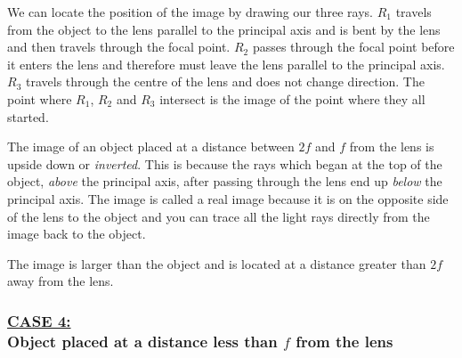 We can locate the position of the image by drawing our three rays. $R_{1}$ travels from the object to the lens parallel to the principal axis and is bent by the lens and then travels through the focal point. $R_{2}$ passes through the focal point before it enters the lens and therefore must leave the lens parallel to the principal axis. $R_{3}$ travels through the centre of the lens and does not change direction. The point where $R_{1}$, $R_{2}$ and $R_{3}$ intersect is the image of the point where they all started.

The image of an object placed at a distance between $2f$ and $f$ from the lens is upside down or \textit{inverted}. This is because the rays which began at the top of the object, \textit{above} the principal axis, after passing through the lens end up \textit{below} the principal axis. The image is called a real image because it is on the opposite side of the lens to the object and you can trace all the light rays directly from the image back to the object.

The image is larger than the object and is located at a distance greater than $2f$ away from the lens.

\subsubsection{\underline{CASE 4:}\\Object placed at a distance less than $f$ from the lens}

